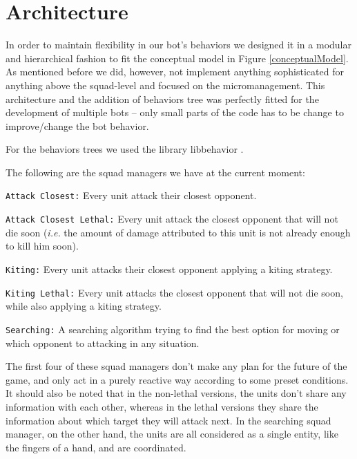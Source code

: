 \section{Architecture}
In order to maintain flexibility in our bot's behaviors we designed it in a modular and hierarchical fashion to fit the conceptual model in Figure \ref{conceptualModel}. As mentioned before we did, however, not implement anything sophisticated for anything above the squad-level and focused on the micromanagement.
This architecture and the addition of behaviors tree was perfectly fitted for the development of multiple bots -- only small parts of the code has to be change to improve/change the bot behavior.

For the behaviors trees we used the library libbehavior \cite{libbehavior}.

The following are the squad managers we have at the current moment:
\begin{shortitem}
\item \texttt{Attack Closest:} Every unit attack their closest opponent.
\item \texttt{Attack Closest Lethal:} Every unit attack the closest opponent that will not die soon (\emph{i.e.} the amount of damage attributed to this unit is not already enough to kill him soon).
\item \texttt{Kiting:} Every unit attacks their closest opponent applying a kiting strategy.
\item \texttt{Kiting Lethal:} Every unit attacks the closest opponent that will not die soon, while also applying a kiting strategy.
\item \texttt{Searching:} A searching algorithm trying to find the best option for moving or which opponent to attacking in any situation.
\end{shortitem}

The first four of these squad managers don't make any plan for the future of the game, and only act in a purely reactive way according to some preset conditions. It should also be noted that in the non-lethal versions, the units don't share any information with each other, whereas in the lethal versions they share the information about which target they will attack next. In the searching squad manager, on the other hand, the units are all considered as a single entity, like the fingers of a hand, and are coordinated.

